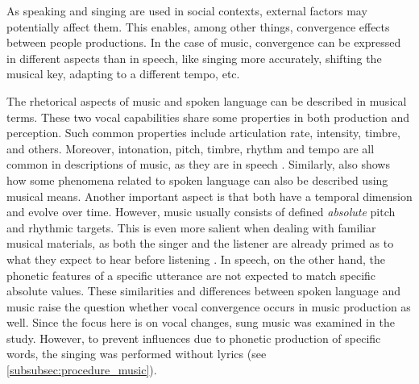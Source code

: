 

As speaking and singing are used in social contexts, external factors may potentially affect them.
This enables, among other things, convergence effects between people productions.
In the case of music, convergence can be expressed in different aspects than in speech, like singing more accurately, shifting the musical key, adapting to a different tempo, etc.

The rhetorical aspects of music and spoken language can be described in musical terms.
These two vocal capabilities share some properties in both production and perception.
Such common properties include articulation rate, intensity, timbre, and others.
Moreover, intonation, pitch, timbre, rhythm and tempo are all common in descriptions of music, as they are in speech \citep{Molino2000toward, Jackendoff2009parallels}.
Similarly, \citet{Day2013speech} also shows how some phenomena related to spoken language can also be described using musical means.
Another important aspect is that both have a temporal dimension and evolve over time.
However, music usually consists of defined \emph{absolute} pitch and rhythmic targets.
This is even more salient when dealing with familiar musical materials, as both the singer and the listener are already primed as to what they expect to hear before listening \citep{Meyer2008emotion}.
In speech, on the other hand, the phonetic features of a specific utterance are not expected to match specific absolute values.
These similarities and differences between spoken language and music raise the question whether vocal convergence occurs in music production as well.
Since the focus here is on vocal changes, sung music was examined in the study.
However, to prevent influences due to phonetic production of specific words, the singing was performed without lyrics (see \cref{subsubsec:procedure_music}).

